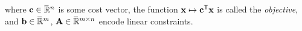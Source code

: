 where $\mat c \in \Rext^{n}$ is some cost vector,
the function $\mat x \mapsto \mat c^{\sf T} \mat x$ is called the \emph{objective},
and $\mat b \in \Rext^m$, $\mat A \in \Rext^{m \times n}$ encode linear constraints.
%
